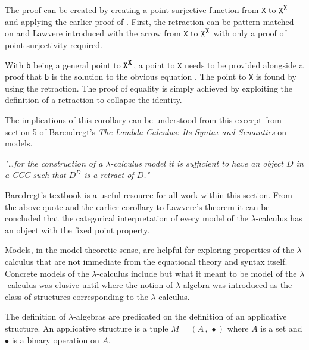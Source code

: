 
The proof can be created by creating a point-surjective function from \verb|X|
to $\verb|X|^{\verb|X|}$ and applying the earlier proof of
. First, the retraction can be pattern matched on and
Lawvere introduced with the arrow from \verb|X| to $\verb|X|^{\verb|X|}$ with
only a proof of point surjectivity required.


With \verb|b| being a general point to $\verb|X|^{\verb|X|}$, a point to
\verb|X| needs to be provided alongside a proof that \verb|b| is the solution to
the obvious equation . The point to \verb|X| is found by
using the retraction. The proof of equality is simply achieved by exploiting the
definition of a retraction to collapse the identity.



The implications of this corollary can be understood from this excerpt from section
5 of Barendregt's \textit{The Lambda Calculus: Its Syntax and Semantics}
\cite{barendregt1992lambda} on
models.

\begin{displayquote}
\textit{"\ldots for the construction of a $\lambda$-calculus model it
is sufficient to have an object $D$ in a CCC such that $D^D$ is a retract of
$D$."}
\end{displayquote}

Baredregt's textbook is a useful resource for all work within this section. From
the above quote and the earlier corollary to Lawvere's theorem it can be
concluded that the categorical interpretation of every model of the
$\lambda$-calculus has an object with the fixed point property.

Models, in the model-theoretic sense, are helpful for exploring properties of
the $\lambda$-calculus that are not immediate from the equational theory and
syntax itself. Concrete models of the $\lambda$-calculus include  but what it meant to be model of the $\lambda$-calculus was elusive
until  where the notion of $\lambda$-algebra was introduced as the
class of structures corresponding to the $\lambda$-calculus.

The definition of $\lambda$-algebras are predicated on the definition of an
applicative structure. An applicative structure is a tuple $M = (A \, , \,
\bullet)$ where $A$ is a set and $\bullet$ is a binary operation on $A$.



